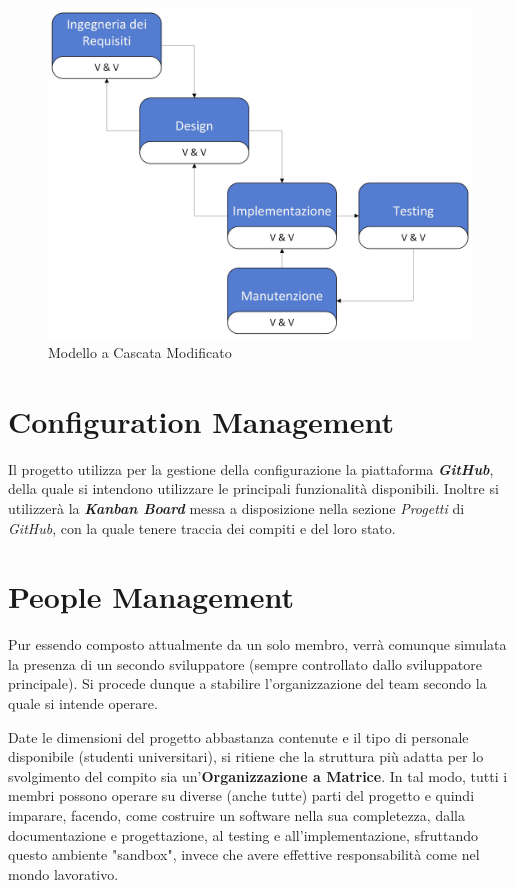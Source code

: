 \documentclass{article}
\begin{document}
\begin{figure}[H]
    \centering
    \includegraphics[width=.8\linewidth]{imgs/Modello a Cascata_0.png}
    \caption{Modello a Cascata Modificato}
    \label{fig:enter-label}
\end{figure}



\section{Configuration Management}
Il progetto utilizza per la gestione della configurazione la piattaforma \textbf{\textit{GitHub}}, della quale si intendono utilizzare le principali funzionalità disponibili. Inoltre si utilizzerà la \textbf{\textit{Kanban Board} }messa a disposizione nella sezione \textit{Progetti} di \textit{GitHub}, con la quale tenere traccia dei compiti e del loro stato. 

\section{People Management}
Pur essendo composto attualmente da un solo membro, verrà comunque simulata la presenza di un secondo sviluppatore (sempre controllato dallo sviluppatore principale). Si procede dunque a stabilire l'organizzazione del team secondo la quale si intende operare. \newline 

Date le dimensioni del progetto abbastanza contenute e il tipo di personale disponibile (studenti universitari), si ritiene che la struttura più adatta per lo svolgimento del compito sia un'\textbf{Organizzazione a Matrice}. In tal modo, tutti i membri possono operare su diverse (anche tutte) parti del progetto e quindi imparare, facendo, come costruire un software nella sua completezza, dalla documentazione e progettazione, al testing e all'implementazione, sfruttando questo ambiente "sandbox", invece che avere effettive responsabilità come nel mondo lavorativo. \newline 
\end{document}
